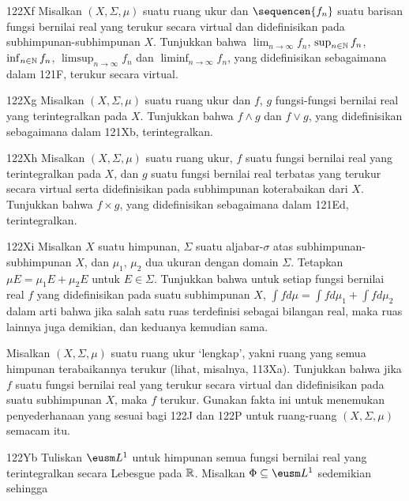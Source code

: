 {\sqheader 122Xf Misalkan $(X,\Sigma,\mu)$ suatu ruang ukur dan
$\sequencen{f_n}$ suatu barisan fungsi bernilai real yang terukur secara
virtual dan didefinisikan pada subhimpunan-subhimpunan $X$. Tunjukkan
bahwa $\lim_{n\to\infty}f_n$, $\sup_{n\in\Bbb N}f_n$,
$\inf_{n\in\Bbb N}f_n$, $\limsup_{n\to\infty}f_n$ dan
$\liminf_{n\to\infty}f_n$, yang didefinisikan sebagaimana dalam 121F,
terukur secara virtual.

\sqheader 122Xg Misalkan $(X,\Sigma,\mu)$ suatu ruang ukur dan $f$, $g$
fungsi-fungsi bernilai real yang terintegralkan pada $X$. Tunjukkan bahwa
$f\wedge g$ dan $f\vee g$, yang didefinisikan sebagaimana dalam 121Xb,
terintegralkan.

\sqheader 122Xh Misalkan $(X,\Sigma,\mu)$ suatu ruang ukur, $f$ suatu
fungsi bernilai real yang terintegralkan pada $X$, dan $g$ suatu fungsi
bernilai real terbatas yang terukur secara virtual serta didefinisikan
pada subhimpunan koterabaikan dari $X$. Tunjukkan bahwa $f\times g$,
yang didefinisikan sebagaimana dalam 121Ed, terintegralkan.

\spheader 122Xi Misalkan $X$ suatu himpunan, $\Sigma$ suatu
aljabar-$\sigma$ atas subhimpunan-subhimpunan $X$, dan $\mu_1$, $\mu_2$
dua ukuran dengan domain $\Sigma$. Tetapkan
$\mu E=\mu_1E+\mu_2E$ untuk $E\in\Sigma$. Tunjukkan bahwa untuk setiap
fungsi bernilai real $f$ yang didefinisikan pada suatu subhimpunan $X$,
$\int fd\mu=\int fd\mu_1+\int fd\mu_2$ dalam arti bahwa jika salah satu
ruas terdefinisi sebagai bilangan real, maka ruas lainnya juga demikian,
dan keduanya kemudian sama. 

 Misalkan $(X,\Sigma,\mu)$ suatu
ruang ukur `lengkap', yakni ruang yang semua himpunan terabaikannya
terukur (lihat, misalnya, 113Xa). Tunjukkan bahwa jika $f$ suatu fungsi
bernilai real yang terukur secara virtual dan didefinisikan pada suatu
subhimpunan $X$, maka $f$ terukur. Gunakan fakta ini untuk menemukan
penyederhanaan yang sesuai bagi 122J dan 122P untuk ruang-ruang
$(X,\Sigma,\mu)$ semacam itu.

\spheader 122Yb Tuliskan $\eusm L^1$ untuk himpunan semua fungsi
bernilai real yang terintegralkan secara Lebesgue pada $\Bbb R$. Misalkan
$\Phi\subseteq\eusm L^1$ sedemikian sehingga

}
